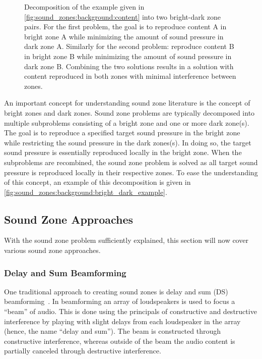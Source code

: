 \begin{figure}[]
    \centering
    \begin{subfigure}{0.49\linewidth}
        \centering
        \scalebox{0.9}{}
    \end{subfigure}
    \begin{subfigure}{0.49\linewidth}
        \centering
        \scalebox{0.9}{}
    \end{subfigure}
    \caption{Decomposition of the example given in \autoref{fig:sound_zones:background:content} into two bright-dark zone pairs.
        For the first problem, the goal is to reproduce content A in bright zone A while minimizing the amount of sound pressure in dark zone A.
        Similarly for the second problem: reproduce content B in bright zone B while minimizing the amount of sound pressure in dark zone B.
        Combining the two solutions results in a solution with content reproduced in both zones with minimal interference between zones.}
    \label{fig:sound_zones:background:bright_dark_example}
\end{figure}

An important concept for understanding sound zone literature is the concept of bright zones and dark zones.
Sound zone problems are typically decomposed into multiple subproblems consisting of a bright zone and one or more dark zone(s).
The goal is to reproduce a specified target sound pressure in the bright zone while restricting the sound pressure in the dark zones(s).
In doing so, the target sound pressure is essentially reproduced locally in the bright zone.
When the subproblems are recombined, the sound zone problem is solved as all target sound pressure is reproduced locally in their respective zones.
To ease the understanding of this concept, an example of this decomposition is given in \autoref{fig:sound_zones:background:bright_dark_example}.

\subsection{Sound Zone Approaches}
With the sound zone problem sufficiently explained, this section will now cover various sound zone approaches.

\subsubsection{Delay and Sum Beamforming}
One traditional approach to creating sound zones is delay and sum (DS) beamforming~\cite{olik2013comparative}.
In beamforming an array of loudspeakers is used to focus a ``beam'' of audio.
This is done using the principals of constructive and destructive interference by playing with slight delays from each loudspeaker in the array (hence, 
the name ``delay and sum'').
The beam is constructed through constructive interference, whereas outside of the beam the audio content is partially canceled through destructive interference.

